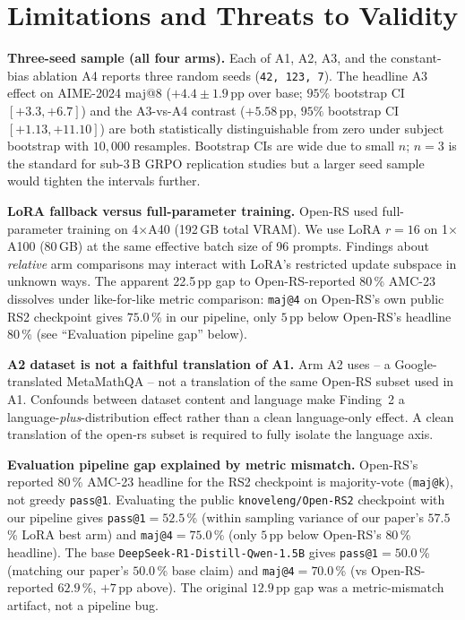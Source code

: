 \documentclass[journal,onecolumn,11pt]{IEEEtran}
\newcommand{\armA}{\textsc{A1}}
\newcommand{\armB}{\textsc{A2}}
\newcommand{\armC}{\textsc{A3}}
\newcommand{\armD}{\textsc{A4}}
\begin{document}
\section{Limitations and Threats to Validity}
\label{sec:limitations}

\textbf{Three-seed sample (all four arms).} Each of \armA{}, \armB{},
\armC{}, and the constant-bias ablation \armD{} reports three random seeds
(\texttt{42, 123, 7}). The headline \armC{} effect on AIME-2024 maj@8
($+4.4\pm 1.9$\,pp over base; $95\%$ bootstrap CI $[+3.3, +6.7]$) and the
\armC{}-vs-\armD{} contrast ($+5.58$\,pp, $95\%$ bootstrap CI
$[+1.13, +11.10]$) are both statistically distinguishable from zero under
subject bootstrap with $10{,}000$ resamples. Bootstrap CIs are wide due to
small $n$; $n=3$ is the standard for sub-3\,B GRPO replication studies but a
larger seed sample would tighten the intervals further.

\textbf{LoRA fallback versus full-parameter training.} Open-RS used
full-parameter training on 4$\times$A40 (192\,GB total VRAM). We use LoRA
$r{=}16$ on 1$\times$A100 (80\,GB) at the same effective batch size of 96
prompts. Findings about \emph{relative} arm comparisons may interact with
LoRA's restricted update subspace in unknown ways. The apparent 22.5\,pp
gap to Open-RS-reported $80$\,\% AMC-23 dissolves under like-for-like
metric comparison: \texttt{maj@4} on Open-RS's own public RS2 checkpoint
gives $75.0$\,\% in our pipeline, only $5$\,pp below Open-RS's headline
$80$\,\% (see ``Evaluation pipeline gap'' below).

\textbf{\armB{} dataset is not a faithful translation of \armA{}.} Arm
\armB{} uses
 -- a Google-translated
MetaMathQA -- not a translation of the same Open-RS subset used in \armA{}.
Confounds between dataset content and language make Finding~2 a
language-\emph{plus}-distribution effect rather than a clean language-only
effect. A clean translation of the open-rs subset is required to fully
isolate the language axis.

\textbf{Evaluation pipeline gap explained by metric mismatch.} Open-RS's
reported $80$\,\% AMC-23 headline for the RS2 checkpoint is majority-vote
(\texttt{maj@k}), not greedy \texttt{pass@1}. Evaluating the public
\texttt{knoveleng/Open-RS2} checkpoint with our pipeline gives
\texttt{pass@1}$=52.5$\,\% (within sampling variance of our paper's $57.5$\,\%
LoRA best arm) and \texttt{maj@4}$=75.0$\,\% (only $5$\,pp below Open-RS's
$80$\,\% headline). The base \texttt{DeepSeek-R1-Distill-Qwen-1.5B} gives
\texttt{pass@1}$=50.0$\,\% (matching our paper's $50.0$\,\% base claim) and
\texttt{maj@4}$=70.0$\,\% (vs Open-RS-reported $62.9$\,\%, $+7$\,pp above).
The original $12.9$\,pp gap was a metric-mismatch artifact, not a pipeline bug.
\end{document}
